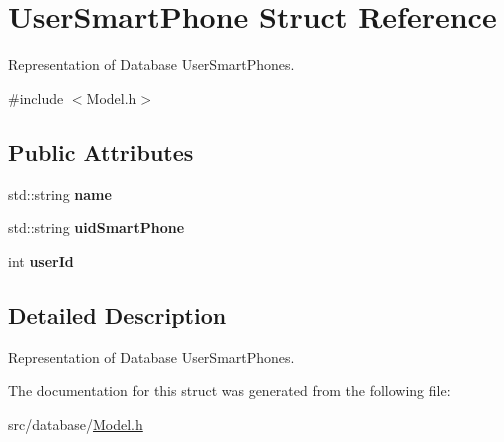 \hypertarget{struct_user_smart_phone}{\section{User\-Smart\-Phone Struct Reference}
\label{struct_user_smart_phone}
}


Representation of Database User\-Smart\-Phones.  




{\ttfamily \#include $<$Model.\-h$>$}

\subsection*{Public Attributes}
\begin{DoxyCompactItemize}
\item 
\hypertarget{struct_user_smart_phone_a83f3b6e93f11e0ee3f75b453f5ac060c}{std\-::string {\bfseries name}}\label{struct_user_smart_phone_a83f3b6e93f11e0ee3f75b453f5ac060c}

\item 
\hypertarget{struct_user_smart_phone_aae537e4fccd612b778f05d1f160a2e0a}{std\-::string {\bfseries uid\-Smart\-Phone}}\label{struct_user_smart_phone_aae537e4fccd612b778f05d1f160a2e0a}

\item 
\hypertarget{struct_user_smart_phone_ad04b86d3ddd6997d0c333073d9afbc4e}{int {\bfseries user\-Id}}\label{struct_user_smart_phone_ad04b86d3ddd6997d0c333073d9afbc4e}

\end{DoxyCompactItemize}


\subsection{Detailed Description}
Representation of Database User\-Smart\-Phones. 

The documentation for this struct was generated from the following file\-:\begin{DoxyCompactItemize}
\item 
src/database/\hyperlink{_model_8h}{Model.\-h}\end{DoxyCompactItemize}
